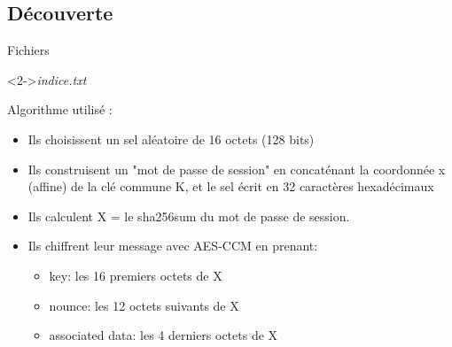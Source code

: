 \documentclass[10pt,sans,usenames,dvipsnames,french,compress]{beamer}
\begin{document}
\subsection{Découverte}
\begin{frame}
	\begin{block}{Fichiers}
		\begin{small}
		\end{small}
	\end{block}

	\begin{block}<2->{\textit{indice.txt}}
		\begin{small}
      Algorithme utilisé :
      \begin{itemize}
        \item Ils choisissent un sel aléatoire de 16 octets (128 bits)
        \item Ils construisent un "mot de passe de session" en concaténant la coordonnée x (affine) de la clé commune K, et le sel écrit en 32 caractères hexadécimaux
        \item Ils calculent X = le sha256sum du mot de passe de session.
        \item Ils chiffrent leur message avec AES-CCM en prenant:
        \begin{itemize}
          \item key: les 16 premiers octets de X
          \item nounce: les 12 octets suivants de X
          \item associated data: les 4 derniers octets de X
        \end{itemize}
      \end{itemize}

		\end{small}
	\end{block}


\end{frame}
\end{document}
